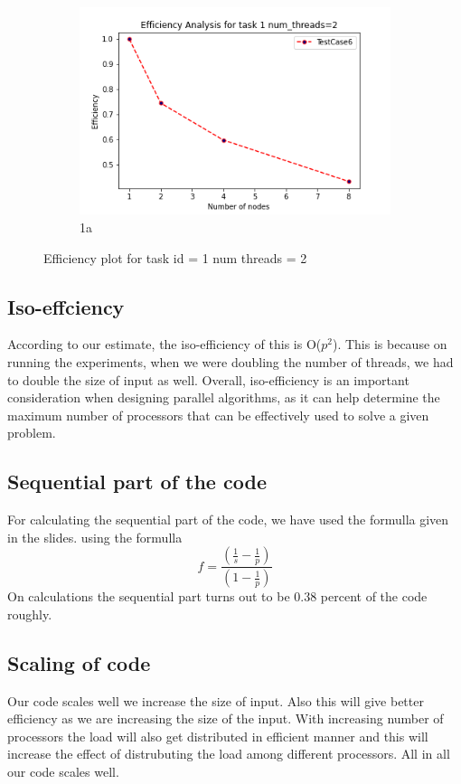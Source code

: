 \documentclass{article}
\begin{document}
\begin{figure}[H]
\begin{subfigure}{.8\textwidth}
  \centering
  \includegraphics[width=.8\linewidth]{Assignment3/report/1eff-threads=2.png}
  \caption{1a}
  \label{fig:sfig1}
\end{subfigure}%
\caption{Efficiency plot for task id = 1 num threads = 2}
\label{fig:fig}
\end{figure}


\subsection{Iso-effciency}
According to our estimate, the iso-efficiency of this is O($p^2$). This is because on running the experiments, when we were doubling the number of threads, we had to double the size of input as well. Overall, iso-efficiency is an important consideration when designing parallel algorithms, as it can help determine the maximum number of processors that can be effectively used to solve a given problem.

\subsection{Sequential part of the code}
For calculating the sequential part of the code, we have used the formulla given in the slides. using the formulla 
\begin{equation}
    f  = \frac{(\frac{1}{s} - \frac{1}{p})}{(1-\frac{1}{p})}
\end{equation}
On calculations the sequential part turns out to be 0.38 percent of the code roughly.

\subsection{Scaling of code}
Our code scales well we increase the size of input. Also this will give better efficiency as we are increasing the size of the input. With increasing number of processors the load will also get distributed in efficient manner and this will increase the effect of distrubuting the load among different processors. All in all our code scales well.
\end{document}

